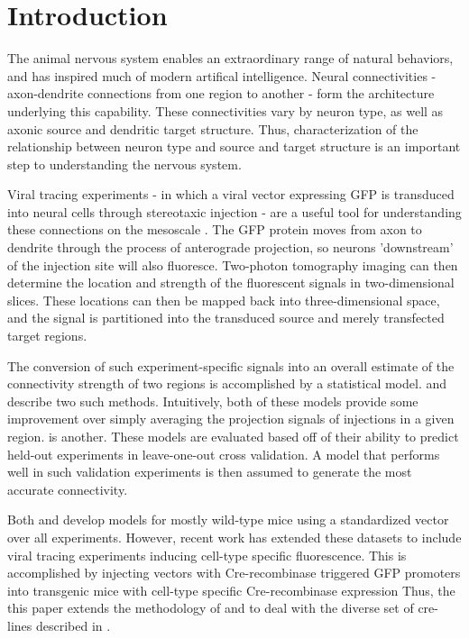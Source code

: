 \section{Introduction}
 
The animal nervous system enables an extraordinary range of natural behaviors, and has inspired much of modern artifical intelligence.
Neural connectivities - axon-dendrite connections from one region to another - form the architecture underlying this capability.
These connectivities vary by neuron type, as well as axonic source and dendritic target structure.
Thus, characterization of the relationship between neuron type and source and target structure is an important step to understanding the nervous system.

Viral tracing experiments - in which a viral vector expressing GFP is transduced into neural cells through stereotaxic injection - are a useful tool for understanding these connections on the mesoscale \citep{Chamberlin1998-hi,Harris2012-fw, Daigle2018-gd}.
The GFP protein moves from axon to dendrite through the process of anterograde projection, so neurons 'downstream' of the injection site will also fluoresce.
Two-photon tomography imaging can then determine the location and strength of the fluorescent signals in two-dimensional slices.
These locations can then be mapped back into three-dimensional space, and
the signal is partitioned into the transduced source and merely transfected target regions.


The conversion of such experiment-specific signals into an overall estimate of the connectivity strength of two regions is accomplished by a statistical model.
\citet{Oh2014-kh} and \citet{Knox2019-ot} describe two such methods.
Intuitively, both of these models provide some improvement over simply averaging the projection signals of injections in a given region.
\citet{} is another.
These models are evaluated based off of their ability to predict held-out experiments in leave-one-out cross validation.
A model that performs well in such validation experiments is then assumed to generate the most accurate connectivity. 

Both \citet{Oh2014-kh} and \citet{Knox2019-ot} develop models for mostly wild-type mice using a standardized vector over all experiments.
However, recent work \citep{Harris2019-mr} has extended these datasets to include viral tracing experiments inducing cell-type specific fluorescence.
This is accomplished by injecting vectors with Cre-recombinase triggered GFP promoters into transgenic mice with cell-type specific Cre-recombinase expression
Thus, the this paper extends the methodology of \citet{Oh2014-kh} and \citet{Knox2019-ot} to deal with the diverse set of cre-lines described in \citet{Harris2019-mr}.

